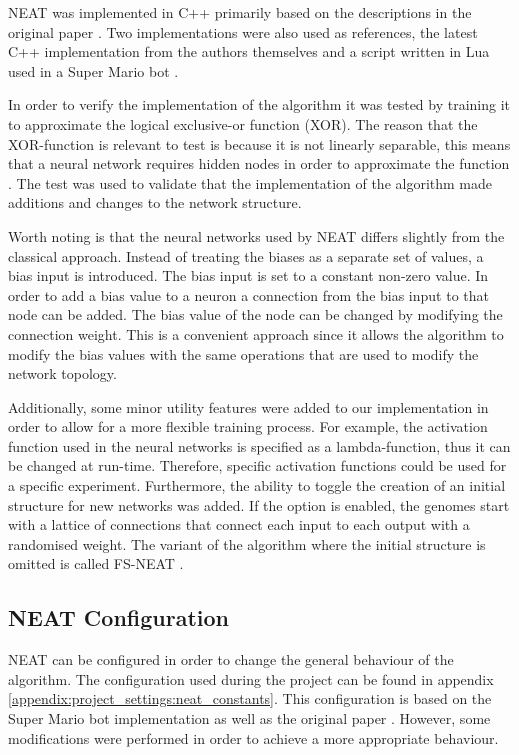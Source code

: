 NEAT was implemented in C++ primarily based on the descriptions in the original paper \cite{stanley:neat}. Two implementations were also used as references, the latest C++ implementation from the authors themselves \cite{neat_source} and a script written in Lua used in a Super Mario bot \cite{mario_source}. 

In order to verify the implementation of the algorithm it was tested by training it to approximate the logical exclusive-or function (XOR). The reason that the XOR-function is relevant to test is because it is not linearly separable, this means that a neural network requires hidden nodes in order to approximate the function \cite{haykin, stanley:neat}. The test was used to validate that the implementation of the algorithm made additions and changes to the network structure. 

Worth noting is that the neural networks used by NEAT differs slightly from the classical approach. Instead of treating the biases as a separate set of values, a bias input is introduced. The bias input is set to a constant non-zero value. In order to add a bias value to a neuron a connection from the bias input to that node can be added. The bias value of the node can be changed by modifying the connection weight. This is a convenient approach since it allows the algorithm to modify the bias values with the same operations that are used to modify the network topology.

Additionally, some minor utility features were added to our implementation in order to allow for a more flexible training process. For example, the activation function used in the neural networks is specified as a lambda-function, thus it can be changed at run-time. Therefore, specific activation functions could be used for a specific experiment. Furthermore, the ability to toggle the creation of an initial structure for new networks was added. If the option is enabled, the genomes start with a lattice of connections that connect each input to each output with a randomised weight.
The variant of the algorithm where the initial structure is omitted is called FS-NEAT \cite{whiteson}.

\subsection{NEAT Configuration}
NEAT can be configured in order to change the general behaviour of the algorithm. The configuration used during the project can be found in appendix \ref{appendix:project_settings:neat_constants}. This configuration is based on the Super Mario bot implementation \cite{mario_source} as well as the original paper \cite{stanley:neat}. However, some modifications were performed in order to achieve a more appropriate behaviour.

